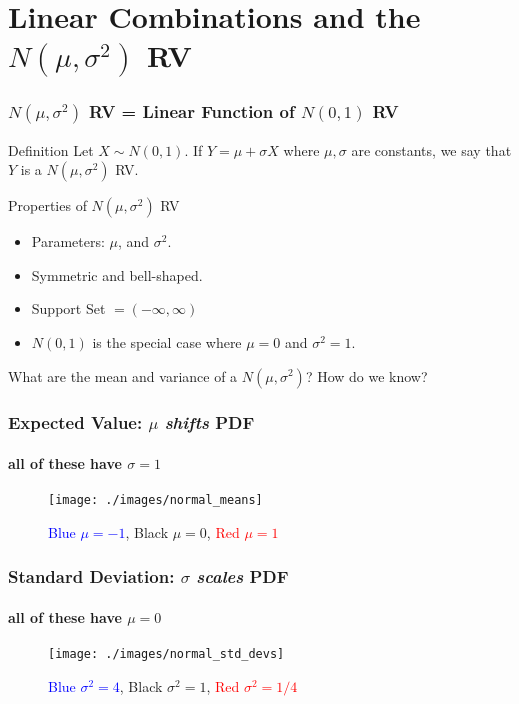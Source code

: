 \section{Linear Combinations and the $N(\mu, \sigma^2)$ RV}
\begin{frame}
  \frametitle{$N(\mu, \sigma^2)$ RV = Linear Function of $N(0,1)$ RV}
  \begin{block}{Definition}
    Let $X \sim N(0,1)$. 
    If $Y = \mu + \sigma X$ where $\mu,\sigma$ are constants, we say that $Y$ is a $N(\mu, \sigma^2)$ RV.
  \end{block}
  \begin{block}{Properties of $N(\mu, \sigma^2)$ RV}
    \begin{itemize}
      \item Parameters: $\mu$, and $\sigma^2$.
      \item Symmetric and bell-shaped. 
      \item Support Set $=(-\infty,\infty)$
      \item $N(0,1)$ is the special case where $\mu=0$ and $\sigma^2 = 1$. 
    \end{itemize}
  \end{block}

  \alert{What are the mean and variance of a $N(\mu, \sigma^2)$? How do we know?}
\end{frame}
\begin{frame}
  \frametitle{Expected Value: $\mu$ \emph{shifts} PDF}
\framesubtitle{all of these have $\sigma=1$}

\begin{figure}
\texttt{[image: ./images/normal\_means]}
\caption{\textcolor{blue}{Blue $\mu = -1$},
Black $\mu = 0$,
\textcolor{red}{Red $\mu = 1$}}
\end{figure}
\end{frame}



\begin{frame}
  \frametitle{Standard Deviation: $\sigma$ \emph{scales} PDF}
\framesubtitle{all of these have $\mu=0$}

\begin{figure}
\texttt{[image: ./images/normal\_std\_devs]}
\caption{\textcolor{blue}{Blue $\sigma^2 = 4$},
Black $\sigma^2=1$,
\textcolor{red}{Red $\sigma^2= 1/4$}}
\end{figure}
\end{frame}

